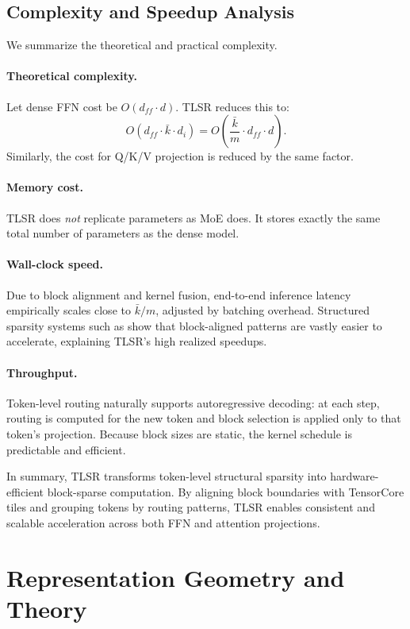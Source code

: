 \documentclass{article}
\theoremstyle{plain}
\theoremstyle{definition}
\theoremstyle{remark}
\begin{document}
\subsection{Complexity and Speedup Analysis}

We summarize the theoretical and practical complexity.

\paragraph{Theoretical complexity.}
Let dense FFN cost be $O(d_{ff}\cdot d)$.
TLSR reduces this to:
\[
O(d_{ff} \cdot \bar{k} \cdot d_i)
  = O\!\left(\frac{\bar{k}}{m} \cdot d_{ff}\cdot d\right).
\]
Similarly, the cost for Q/K/V projection is reduced by the same factor.

\paragraph{Memory cost.}
TLSR does \emph{not} replicate parameters as MoE does.
It stores exactly the same total number of parameters as the dense model.

\paragraph{Wall-clock speed.}
Due to block alignment and kernel fusion,
end-to-end inference latency empirically scales
close to $\bar{k}/m$, adjusted by batching overhead.
Structured sparsity systems such as
\cite{yu2023gpusqtlm,li2024edgesparsity}
show that block-aligned patterns are vastly easier to accelerate,
explaining TLSR’s high realized speedups.

\paragraph{Throughput.}
Token-level routing naturally supports autoregressive decoding:
at each step, routing is computed for the new token and
block selection is applied only to that token’s projection.
Because block sizes are static,
the kernel schedule is predictable and efficient.

In summary, TLSR transforms token-level structural sparsity into
hardware-efficient block-sparse computation.
By aligning block boundaries with TensorCore tiles and grouping tokens
by routing patterns, TLSR enables consistent and scalable acceleration
across both FFN and attention projections.


\section{Representation Geometry and Theory}
\end{document}
